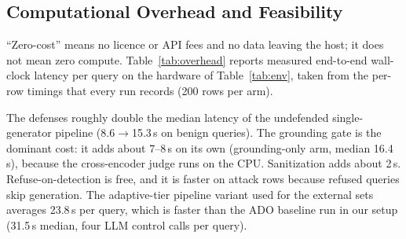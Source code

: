 \documentclass[conference]{IEEEtran}
\begin{document}
\subsection{Computational Overhead and Feasibility}\label{sec:overhead}
``Zero-cost'' means no licence or API fees and no data leaving the host; it does not mean zero compute. Table~\ref{tab:overhead} reports measured end-to-end wall-clock latency per query on the hardware of Table~\ref{tab:env}, taken from the per-row timings that every run records (200 rows per arm).

\begin{table}[t]
\centering
\caption{End-to-end latency per query (seconds; median / 95th percentile; 200 rows per cell unless noted) on an RTX 4060 Laptop GPU (8\,GB).}
\label{tab:overhead}
\setlength{\tabcolsep}{3pt}
\small
{}
\end{table}

The defenses roughly double the median latency of the undefended single-generator pipeline (8.6$\rightarrow$15.3\,s on benign queries). The grounding gate is the dominant cost: it adds about 7--8\,s on its own (grounding-only arm, median 16.4\,s), because the cross-encoder judge runs on the CPU. Sanitization adds about 2\,s. Refuse-on-detection is free, and it is faster on attack rows because refused queries skip generation. The adaptive-tier pipeline variant used for the external sets averages 23.8\,s per query, which is faster than the ADO baseline run in our setup (31.5\,s median, four LLM control calls per query).
\end{document}
